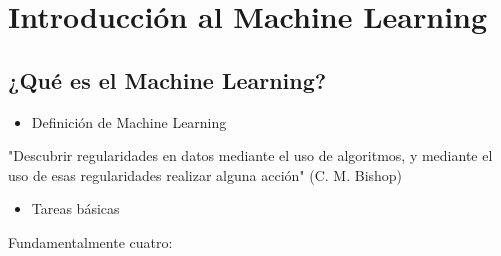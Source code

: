 \section{Introducción al Machine Learning}
\subsection*{¿Qué es el Machine Learning?}
\begin{itemize}[label=\color{red}\textbullet, leftmargin=*]
	\item \color{lightblue}Definición de Machine Learning
\end{itemize}
"Descubrir regularidades en datos mediante el uso de algoritmos, y mediante el uso de esas regularidades realizar alguna acción" (C. M. Bishop)
\begin{itemize}[label=\color{red}\textbullet, leftmargin=*]
	\item \color{lightblue}Tareas básicas
\end{itemize}
Fundamentalmente cuatro:
